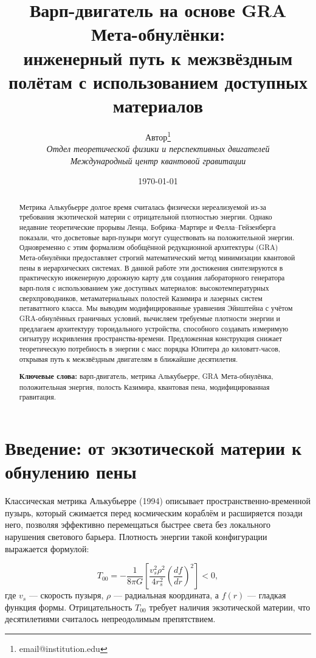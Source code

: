 \documentclass[11pt]{article}
\title{Варп-двигатель на основе GRA Мета-обнулёнки: \\
инженерный путь к межзвёздным полётам с использованием доступных материалов}
\author{Автор\thanks{email@institution.edu} \\
\textit{Отдел теоретической физики и перспективных двигателей} \\
\textit{Международный центр квантовой гравитации}}
\date{\today}
\begin{document}
\maketitle

\begin{abstract}
Метрика Алькубьерре долгое время считалась физически нереализуемой из-за требования экзотической материи с отрицательной плотностью энергии. Однако недавние теоретические прорывы Ленца, Бобрика--Мартире и Фелла--Гейзенберга показали, что досветовые варп-пузыри могут существовать на положительной энергии. Одновременно с этим формализм обобщённой редукционной архитектуры (GRA) Мета-обнулёнки предоставляет строгий математический метод минимизации квантовой пены в иерархических системах. В данной работе эти достижения синтезируются в практическую инженерную дорожную карту для создания лабораторного генератора варп-поля с использованием уже доступных материалов: высокотемпературных сверхпроводников, метаматериальных полостей Казимира и лазерных систем петаваттного класса. Мы выводим модифицированные уравнения Эйнштейна с учётом GRA-обнулённых граничных условий, вычисляем требуемые плотности энергии и предлагаем архитектуру тороидального устройства, способного создавать измеримую сигнатуру искривления пространства-времени. Предложенная конструкция снижает теоретическую потребность в энергии с масс порядка Юпитера до киловатт-часов, открывая путь к межзвёздным двигателям в ближайшие десятилетия.

\textbf{Ключевые слова:} варп-двигатель, метрика Алькубьерре, GRA Мета-обнулёнка, положительная энергия, полость Казимира, квантовая пена, модифицированная гравитация.
\end{abstract}

\section{Введение: от экзотической материи к обнулению пены}

Классическая метрика Алькубьерре (1994) описывает пространственно-временной пузырь, который сжимается перед космическим кораблём и расширяется позади него, позволяя эффективно перемещаться быстрее света без локального нарушения светового барьера. Плотность энергии такой конфигурации выражается формулой:

\begin{equation}
T_{00} = -\frac{1}{8\pi G} \left[ \frac{v_s^2 \rho^2}{4 r_s^2} \left( \frac{df}{dr} \right)^2 \right] < 0,
\label{eq:alcubierre_energy}
\end{equation}
где $v_s$ — скорость пузыря, $\rho$ — радиальная координата, а $f(r)$ — гладкая функция формы. Отрицательность $T_{00}$ требует наличия экзотической материи, что десятилетиями считалось непреодолимым препятствием.
\end{document}
